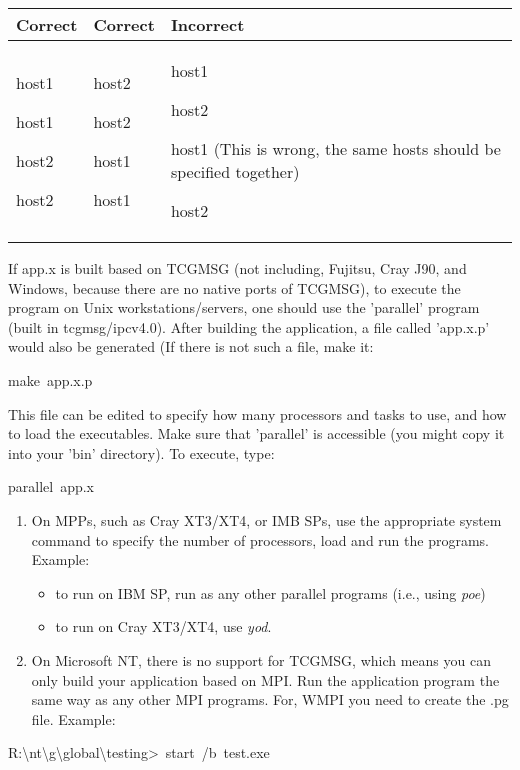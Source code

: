 \begin{tabular}{|>{\centering}p{2cm}|>{\centering}p{2cm}|>{\raggedright}p{3cm}|}
\hline 
Correct & Correct & Incorrect\tabularnewline
\hline
\hline 
host1

host1

host2

host2 & host2

host2

host1

host1 & host1

host2

host1 (This is wrong, the same hosts should be specified together)

host2\tabularnewline
\hline
\end{tabular}

If app.x is built based on TCGMSG (not including, Fujitsu, Cray J90,
and Windows, because there are no native ports of TCGMSG), to execute
the program on Unix workstations/servers, one should use the 'parallel'
program (built in tcgmsg/ipcv4.0). After building the application,
a file called 'app.x.p' would also be generated (If there is not such
a file, make it: 
\begin{lyxcode}
make~app.x.p
\end{lyxcode}
This file can be edited to specify how many processors and tasks to
use, and how to load the executables. Make sure that 'parallel' is
accessible (you might copy it into your 'bin' directory). To execute,
type:
\begin{lyxcode}
parallel~app.x~\end{lyxcode}
\begin{enumerate}
\item On MPPs, such as Cray XT3/XT4, or IMB SPs, use the appropriate system
command to specify the number of processors, load and run the programs.
Example: 

\begin{itemize}
\item to run on IBM SP, run as any other parallel programs (i.e., using
\emph{poe}) 
\item to run on Cray XT3/XT4, use \emph{yod}.
\end{itemize}
\item On Microsoft NT, there is no support for TCGMSG, which means you can
only build your application based on MPI. Run the application program
the same way as any other MPI programs. For, WMPI you need to create
the .pg file. Example: \end{enumerate}
\begin{lyxcode}
R:\textbackslash{}nt\textbackslash{}g\textbackslash{}global\textbackslash{}testing>~start~/b~test.exe
\end{lyxcode}

